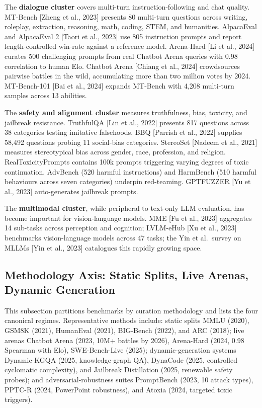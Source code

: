 The \textbf{dialogue cluster} covers multi-turn instruction-following and chat quality. MT-Bench {[}Zheng et al., 2023{]} presents 80 multi-turn questions across writing, roleplay, extraction, reasoning, math, coding, STEM, and humanities. AlpacaEval and AlpacaEval 2 {[}Taori et al., 2023{]} use 805 instruction prompts and report length-controlled win-rate against a reference model. Arena-Hard {[}Li et al., 2024{]} curates 500 challenging prompts from real Chatbot Arena queries with 0.98 correlation to human Elo. Chatbot Arena {[}Chiang et al., 2024{]} crowdsources pairwise battles in the wild, accumulating more than two million votes by 2024. MT-Bench-101 {[}Bai et al., 2024{]} expands MT-Bench with 4,208 multi-turn samples across 13 abilities.

The \textbf{safety and alignment cluster} measures truthfulness, bias, toxicity, and jailbreak resistance. TruthfulQA {[}Lin et al., 2022{]} presents 817 questions across 38 categories testing imitative falsehoods. BBQ {[}Parrish et al., 2022{]} supplies 58,492 questions probing 11 social-bias categories. StereoSet {[}Nadeem et al., 2021{]} measures stereotypical bias across gender, race, profession, and religion. RealToxicityPrompts contains 100k prompts triggering varying degrees of toxic continuation. AdvBench (520 harmful instructions) and HarmBench (510 harmful behaviours across seven categories) underpin red-teaming. GPTFUZZER {[}Yu et al., 2023{]} auto-generates jailbreak prompts.

The \textbf{multimodal cluster}, while peripheral to text-only LLM evaluation, has become important for vision-language models. MME {[}Fu et al., 2023{]} aggregates 14 sub-tasks across perception and cognition; LVLM-eHub {[}Xu et al., 2023{]} benchmarks vision-language models across 47 tasks; the Yin et al.~survey on MLLMs {[}Yin et al., 2023{]} catalogues this rapidly growing space.

\subsection{Methodology Axis: Static Splits, Live Arenas, Dynamic Generation}\label{methodology-axis-static-splits-live-arenas-dynamic-generation}

This subsection partitions benchmarks by curation methodology and lists the four canonical regimes. Representative methods include: static splits MMLU (2020), GSM8K (2021), HumanEval (2021), BIG-Bench (2022), and ARC (2018); live arenas Chatbot Arena (2023, 10M+ battles by 2026), Arena-Hard (2024, 0.98 Spearman with Elo), SWE-Bench-Live (2025); dynamic-generation systems Dynamic-KGQA (2025, knowledge-graph QA), DynaCode (2025, controlled cyclomatic complexity), and Jailbreak Distillation (2025, renewable safety probes); and adversarial-robustness suites PromptBench (2023, 10 attack types), PPTC-R (2024, PowerPoint robustness), and Atoxia (2024, targeted toxic triggers).

